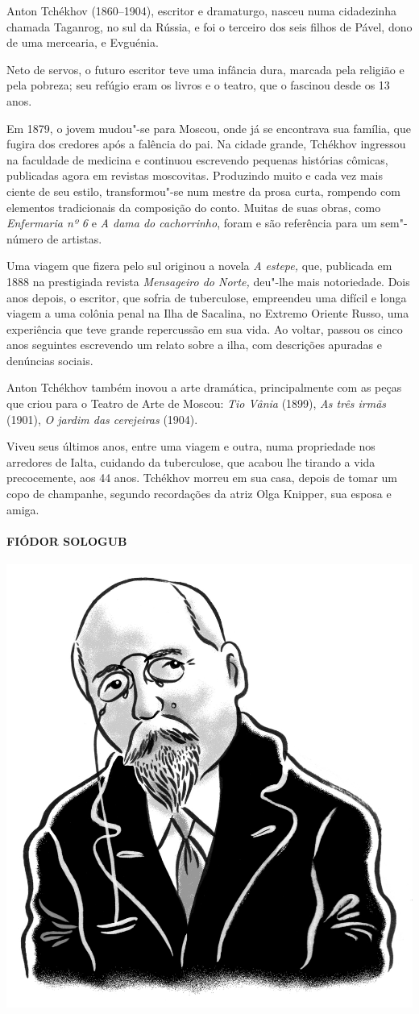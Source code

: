 \noindent{}Anton Tchékhov (1860--1904), escritor e dramaturgo, nasceu numa
cidadezinha chamada Taganrog, no sul da Rússia, e foi o terceiro dos
seis filhos de Pável, dono de uma mercearia, e Evguénia.

Neto de servos, o futuro escritor teve uma infância dura, marcada pela
religião e pela pobreza; seu refúgio eram os livros e o teatro, que o
fascinou desde os 13 anos.

Em 1879, o jovem mudou"-se para Moscou, onde já se encontrava sua
família, que fugira dos credores após a falência do pai. Na cidade
grande, Tchékhov ingressou na faculdade de medicina e continuou
escrevendo pequenas histórias cômicas, publicadas agora em revistas
moscovitas. Produzindo muito e cada vez mais ciente de seu estilo,
transformou"-se num mestre da prosa curta, rompendo com elementos
tradicionais da composição do conto. Muitas de suas obras, como
\emph{Enfermaria nº 6} e \emph{A dama do cachorrinho}, foram e são
referência para um sem"-número de artistas.

Uma viagem que fizera pelo sul originou a novela \emph{A estepe,}
que, publicada em 1888 na prestigiada revista \emph{Mensageiro do
Norte,} deu"-lhe mais notoriedade. Dois anos depois, o escritor, que
sofria de tuberculose, empreendeu uma difícil e longa viagem a uma
colônia penal na Ilha dе Sacalina, no Extremo Oriente Russo, uma
experiência que teve grande repercussão em sua vida. Ao voltar, passou
os cinco anos seguintes escrevendo um relato sobre a ilha, com
descrições apuradas e denúncias sociais.

Anton Tchékhov também inovou a arte dramática, principalmente com as
peças que criou para o Teatro de Arte de Moscou: \emph{Tio Vânia}
(1899), \emph{As três irmãs} (1901), \emph{O jardim das cerejeiras}
(1904).

Viveu seus últimos anos, entre uma viagem e outra, numa propriedade nos
arredores de Ialta, cuidando da tuberculose, que acabou lhe tirando a
vida precocemente, aos 44 anos. Tchékhov morreu em sua casa, depois de
tomar um copo de champanhe, segundo recordações da atriz Olga Knipper,
sua esposa e amiga.

\paragraph{FIÓDOR SOLOGUB}

\noindent\includegraphics[width=.8in]{./imgs/autor7.jpg}

